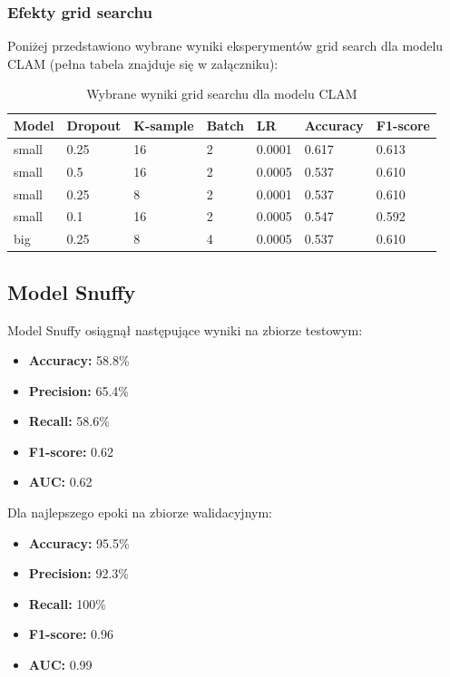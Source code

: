 \documentclass{article}
\begin{document}
\subsubsection{Efekty grid searchu}
Poniżej przedstawiono wybrane wyniki eksperymentów grid search dla modelu CLAM (pełna tabela znajduje się w załączniku):

\begin{table}[H]
\centering
\begin{tabular}{lllllll}
\toprule
Model & Dropout & K-sample & Batch & LR & Accuracy & F1-score \\
\midrule
small & 0.25 & 16 & 2 & 0.0001 & 0.617 & 0.613 \\
small & 0.5 & 16 & 2 & 0.0005 & 0.537 & 0.610 \\
small & 0.25 & 8 & 2 & 0.0001 & 0.537 & 0.610 \\
small & 0.1 & 16 & 2 & 0.0005 & 0.547 & 0.592 \\
\midrule
big & 0.25 & 8 & 4 & 0.0005 & 0.537 & 0.610 \\
\bottomrule
\end{tabular}
\caption{Wybrane wyniki grid searchu dla modelu CLAM}
\end{table}

\subsection{Model Snuffy}
Model Snuffy osiągnął następujące wyniki na zbiorze testowym:
\begin{itemize}
    \item \textbf{Accuracy:} 58.8\%
    \item \textbf{Precision:} 65.4\%
    \item \textbf{Recall:} 58.6\%
    \item \textbf{F1-score:} 0.62
    \item \textbf{AUC:} 0.62
\end{itemize}

Dla najlepszego epoki na zbiorze walidacyjnym:
\begin{itemize}
    \item \textbf{Accuracy:} 95.5\%
    \item \textbf{Precision:} 92.3\%
    \item \textbf{Recall:} 100\%
    \item \textbf{F1-score:} 0.96
    \item \textbf{AUC:} 0.99
\end{itemize}
\end{document}
